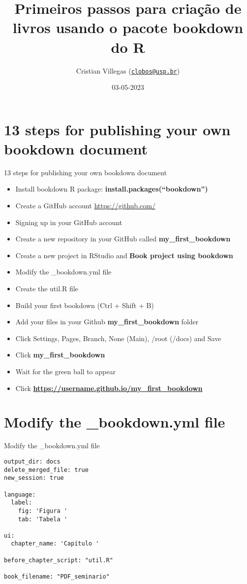 \documentclass[
  ignorenonframetext,
]{beamer}
\title{Primeiros passos para criação de livros usando o pacote bookdown
do R}
\author{Cristian Villegas
(\href{mailto:clobos@usp.br}{\nolinkurl{clobos@usp.br}})}
\date{03-05-2023}
\institute{USP, Departamento de Ciências Exatas}
\providecommand{\tightlist}{%
  \setlength{\itemsep}{0pt}\setlength{\parskip}{0pt}}
\begin{document}
\frame{\titlepage}

\hypertarget{steps-for-publishing-your-own-bookdown-document}{%
\section{13 steps for publishing your own bookdown
document}\label{steps-for-publishing-your-own-bookdown-document}}

\begin{frame}{13 steps for publishing your own bookdown document}
\protect\hypertarget{steps-for-publishing-your-own-bookdown-document-1}{}
\begin{itemize}
\tightlist
\item
  Install bookdown R package: \textbf{install.packages(``bookdown'')}
\item
  Create a GitHub account \url{https://github.com/}
\item
  Signing up in your GitHub account
\item
  Create a new repository in your GitHub called
  \textbf{my\_first\_bookdown}
\item
  Create a new project in RStudio and \textbf{Book project using
  bookdown}
\item
  Modify the \_bookdown.yml file
\item
  Create the util.R file
\item
  Build your first bookdown (Ctrl + Shift + B)
\item
  Add your files in your Github \textbf{my\_first\_bookdown} folder
\item
  Click Settings, Pages, Branch, None (Main), /root (/docs) and Save
\item
  Click \textbf{my\_first\_bookdown}
\item
  Wait for the green ball to appear
\item
  Click \textbf{\url{https://username.github.io/my_first_bookdown}}
\end{itemize}
\end{frame}

\hypertarget{modify-the-_bookdown.yml-file}{%
\section{Modify the \_bookdown.yml
file}\label{modify-the-_bookdown.yml-file}}

\begin{frame}[fragile]{Modify the \_bookdown.yml file}
\protect\hypertarget{modify-the-_bookdown.yml-file-1}{}
\begin{verbatim}
output_dir: docs
delete_merged_file: true
new_session: true

language:
  label:
    fig: 'Figura '
    tab: 'Tabela '

ui:
  chapter_name: 'Capítulo '
  
before_chapter_script: "util.R"

book_filename: "PDF_seminario" 
\end{verbatim}
\end{frame}
\end{document}
